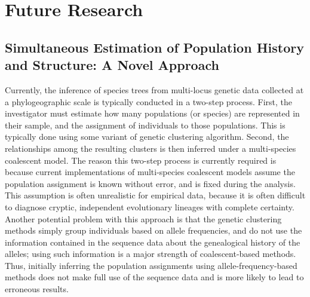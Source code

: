 \documentclass[10pt]{article}
\begin{document}
\section*{Future Research}
\subsection*{Simultaneous Estimation of Population History and Structure: A Novel Approach}
Currently, the inference of species trees from multi-locus genetic data collected at a phylogeographic scale is typically conducted in a two-step process.
First, the investigator must estimate how many populations (or species) are represented in their sample, and the assignment of individuals to those populations.
This is typically done using some variant of genetic clustering algorithm.
Second, the relationships among the resulting clusters is then inferred under a multi-species coalescent model.
The reason this two-step process is currently required is because current implementations of multi-species coalescent models assume the population assignment is known without error, and is fixed during the analysis.
This assumption is often unrealistic for empirical data, because it is often difficult to diagnose cryptic, independent evolutionary lineages with complete certainty.
Another potential problem with this approach is that the genetic clustering methods simply group individuals based on allele frequencies, and do not use the information contained in the sequence data about the genealogical history of the alleles; using such information is a major strength of coalescent-based methods.
Thus, initially inferring the population assignments using allele-frequency-based methods does not make full use of the sequence data and is more likely to lead to erroneous results.
\end{document}
